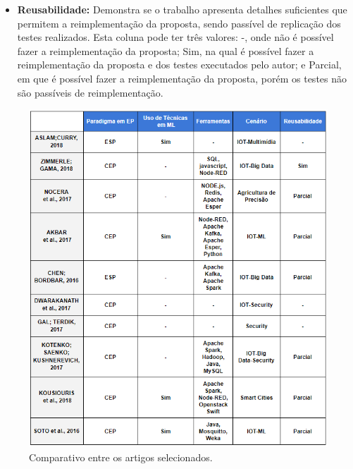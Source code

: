 \documentclass[ti,table]{texufpel} %
\begin{document}
\begin{itemize}
     

     \item \textbf{Reusabilidade:} Demonstra se o trabalho apresenta detalhes suficientes que permitem a reimplementação da proposta, sendo passível de replicação dos testes realizados. Esta coluna pode ter três valores: -, onde não é possível fazer a reimplementação da proposta; Sim, na qual é possível fazer a reimplementação da proposta e dos testes executados pelo autor; e Parcial, em que é possível fazer a reimplementação da proposta, porém os testes não são passíveis de reimplementação. 

   

\end{itemize} 

  

\begin{figure} 

    \centering 

    \includegraphics[width=1\textwidth]{imagens/comparacaoArtigos.png} 

    \caption{Comparativo entre os artigos selecionados.} 

    \label{fig:comparacaoArtigos} 

\end{figure} 
\end{document}

